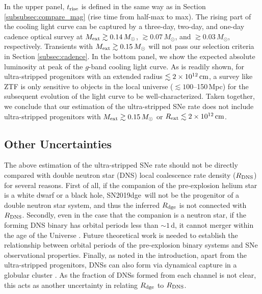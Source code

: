 \documentclass[twocolumn]{aastex63}
\newcommand{\name}{SN2019dge}
\begin{document}
\begin{CJK*}{UTF8}{gbsn}
In the upper panel, $t_{\rm rise}$ is defined in the same 
way as in Section \ref{subsubsec:compare_mag} (rise time from half-max to max). The rising part of 
the cooling light curve can be captured by a three-day, two-day, and one-day cadence optical survey 
at $M_{\rm ext}\gtrsim 0.14\,M_\odot$, $\gtrsim 0.07\,M_\odot$, and $\gtrsim 0.03\,M_\odot$, 
respectively. Transients with $M_{\rm ext} \gtrsim 0.15\,M_\odot$ will not pass our selection criteria in 
Section \ref{subsec:cadence}. In the bottom panel, we show the expected absolute luminosity at 
peak of the $g$-band cooling light curve. As is readily shown, for ultra-stripped progenitors with an 
extended radius $\lesssim 2\times 10^{12}\,{\rm cm}$, a survey like ZTF is only sensitive to objects
in the local universe ($\lesssim 100$--150\,Mpc) for the subsequent evolution of the light curve to be 
well-characterized. Taken together, we conclude that our estimation of the ultra-stripped SNe rate 
does not include ultra-stripped progenitors with $M_{\rm ext}\gtrsim 0.15\,M_\odot$ or $R_{\rm 
ext}\lesssim 2\times 10^{12}\,{\rm cm}$.  

\subsection{Other Uncertainties} 
\label{subsec:companion}

The above estimation of the ultra-stripped SNe rate should not be directly compared with double 
neutron star (DNS) local coalescence rate density ($R_{\rm DNS}$) for several reasons. First of all, 
if the companion of the pre-explosion helium star is a white dwarf or a black hole, \name\ will 
not be the progenitor of a double neutron star system, and thus the inferred $R_{\rm dge}$ is 
not connected with $R_{\rm DNS}$. Secondly, even in the case that the companion is a neutron star, if 
the forming DNS binary has orbital periods less than $\sim1$\,d, it cannot merger within the age of the 
Universe \citep{Tauris2015}. Future theoretical work is needed to establish the relationship between 
orbital periods of the pre-explosion binary systems and SNe observational properties. Finally, as noted 
in the introduction, apart from the ultra-stripped progenitors, DNSs can also form via dynamical 
capture in a globular cluster \citep{East2012, Andrews2019}. As the fraction of DNSs formed from each 
channel is not clear, this acts as another uncertainty in relating $R_{\rm dge}$ to $R_{\rm DNS}$. 


\end{CJK*}
\end{document}
